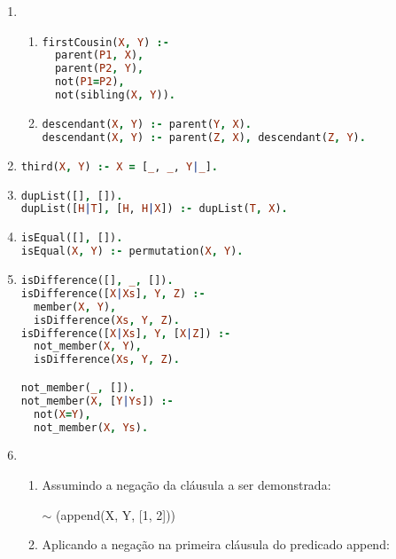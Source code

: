 \documentclass{article}
\begin{document}
    \begin{enumerate}
        \item 
            \begin{enumerate}
                \item 
\begin{lstlisting}[language=prolog]
firstCousin(X, Y) :-
  parent(P1, X),
  parent(P2, Y),
  not(P1=P2),
  not(sibling(X, Y)).
\end{lstlisting}    

                \item 
\begin{lstlisting}[language=prolog]
descendant(X, Y) :- parent(Y, X).
descendant(X, Y) :- parent(Z, X), descendant(Z, Y).
\end{lstlisting}
            \end{enumerate}

            \item 
\begin{lstlisting}[language=prolog]
third(X, Y) :- X = [_, _, Y|_].
\end{lstlisting}

            \item 
\begin{lstlisting}[language=prolog]
dupList([], []).
dupList([H|T], [H, H|X]) :- dupList(T, X).
\end{lstlisting}

            \item 
\begin{lstlisting}[language=prolog]
isEqual([], []).
isEqual(X, Y) :- permutation(X, Y).
\end{lstlisting}

            \item 
\begin{lstlisting}[language=prolog]
isDifference([], _, []).
isDifference([X|Xs], Y, Z) :-
  member(X, Y),
  isDifference(Xs, Y, Z).
isDifference([X|Xs], Y, [X|Z]) :-
  not_member(X, Y),
  isDifference(Xs, Y, Z).

not_member(_, []).
not_member(X, [Y|Ys]) :-
  not(X=Y),
  not_member(X, Ys).
\end{lstlisting}
            \item 
                \begin{enumerate}[I]
                    \item 
                        Assumindo a negação da cláusula a ser demonstrada: 

                        $\sim$ (append(X, Y, [1, 2]))
                    \item Aplicando a negação na primeira cláusula do predicado append:


\end{enumerate}
\end{enumerate}
\end{document}
